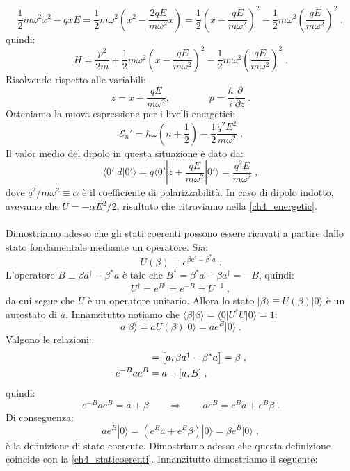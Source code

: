 \documentclass[12pt,a4paper]{report}
\theoremstyle{definition}
\numberwithin{equation}{section}
\newcommand{\bra}{\langle}
\newcommand{\ket}{\rangle}
\newcommand{\adj}[1]{#1^{\dagger}}
\begin{document}
$$
\frac{1}{2}m\omega^2 x^2-qxE=\frac{1}{2}m\omega^2\left(x^2-\frac{2qE}{m\omega^2}x\right)=\frac{1}{2}\left(x-\frac{qE}{m\omega^2}\right)^2-\frac{1}{2}m\omega^2\left(\frac{qE}{m\omega^2}\right)^2\;,
$$
quindi:
\begin{equation}
H=\frac{p^2}{2m}+\frac{1}{2}m\omega^2\left(x-\frac{qE}{m\omega^2}\right)^2-\frac{1}{2}m\omega^2\left(\frac{qE}{m\omega^2}\right)^2\;.
\end{equation}
Risolvendo rispetto alle variabili:
$$
z=x-\frac{qE}{m\omega^2},\qquad\qquad p=\frac{\hbar}{i}\frac{\partial}{\partial z}\;.
$$
Otteniamo la nuova espressione per i livelli energetici:
\begin{equation}
\mathcal{E}_n'=\hbar\omega\left(n+\frac{1}{2}\right)-\frac{1}{2}\frac{q^2E^2}{m\omega^2}\;. \label{ch4_energetic}
\end{equation}
Il valor medio del dipolo in questa situazione è dato da:
\begin{equation}
\bra 0'|d|0'\ket=q\bra 0'|z+\frac{qE}{m\omega^2}|0'\ket=\frac{q^2E}{m\omega^2}\;,
\end{equation}
dove $q^2/m\omega^2\equiv \alpha$ è il coefficiente di polarizzabilità. In caso di dipolo indotto, avevamo che $U=-\alpha E^2/2$, risultato che ritroviamo nella \eqref{ch4_energetic}. \\
\\
Dimostriamo adesso che gli stati coerenti possono essere ricavati a partire dallo stato fondamentale mediante un operatore. Sia:
\begin{equation}
U(\beta)\equiv e^{\beta\adj{a}-\beta^*a}\;.
\end{equation}
L'operatore $B\equiv \beta\adj{a}-\beta^*a$ è tale che $\adj{B}=\beta^*a-\beta\adj{a}=-B$, quindi:
$$
\adj{U}=e^{\adj{B}}=e^{-B}=U^{-1}\;,
$$
da cui segue che $U$ è un operatore unitario. Allora lo stato $|\beta\ket\equiv U(\beta)|0\ket$ è un autostato di $a$. Innanzitutto notiamo che $\bra\beta|\beta\ket=\bra 0|\adj{U}U|0\ket=1$:
$$
a|\beta\ket=aU(\beta)|0\ket=ae^B|0\ket\;.
$$
Valgono le relazioni:
\begin{align}
[a,B]&=\left[a,\beta\adj{a}-\beta^*a\right]=\beta\;, \notag \\
e^{-B}ae^B&=a+[a,B]\;,
\end{align}
quindi:
$$
e^{-B}ae^B=a+\beta \qquad \Longrightarrow \qquad ae^B=e^Ba+e^B\beta\;.
$$
Di conseguenza:
\begin{equation}
ae^B|0\ket=(e^Ba+e^B\beta)|0\ket=\beta e^B|0\ket\;,
\end{equation}
è la definizione di stato coerente. Dimostriamo adesso che questa definizione coincide con la \eqref{ch4_staticoerenti}. Innanzitutto dimostriamo il seguente:
\end{document}
